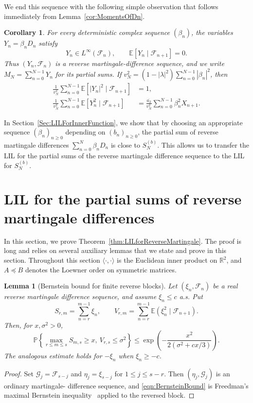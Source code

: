 \documentclass[12pt, reqno, final, a4paper]{amsart}
\theoremstyle{plain}
\newtheorem{lemma}[theorem]{Lemma}
\newtheorem{corollary}[theorem]{Corollary}
\theoremstyle{definition}
\theoremstyle{remark}
\newcommand{\E}{\mathbb E}
\newcommand{\1}{\mathbf 1}
\begin{document}
We end this sequence with the following simple observation that follows immediately from Lemma~\ref{cor:MomentsOfDn}. 
\begin{corollary}\label{cor:reversemartingale}
For every deterministic complex sequence $(\beta_n)$, the variables
$Y_n=\beta_nD_n$ satisfy
\[
 Y_n\in L^\infty(\mathcal F_n),\qquad
 \E[Y_n\mid\mathcal F_{n+1}]=0.
\]
Thus $(Y_n,\mathcal F_n)$ is a reverse martingale-difference sequence, and we
write $M_N=\sum_{n=0}^{N-1}Y_n$ for its partial sums. If
$v_N^2=(1-|\lambda|^2)\sum_{n=0}^{N-1}|\beta_n|^2$, then
\begin{align}
 \frac1{v_N^2}\sum_{n=0}^{N-1}
 \E[|Y_n|^2\mid\mathcal F_{n+1}]&=1,
 \label{eqn:QuadraticVariation}\\
 \frac1{v_N^2}\sum_{n=0}^{N-1}
 \E[Y_n^2\mid\mathcal F_{n+1}]&=
 \frac{\overline{a_2}}{v_N^2}
 \sum_{n=0}^{N-1}\beta_n^2X_{n+1}.
 \label{eqn:QuadraticCov}
\end{align}
\end{corollary}

In Section~\ref{Sec:LILForInnerFunction}, we show that by choosing an appropriate sequence $(\beta_n)_{n\geq 0}$ depending on $(b_n)_{n\geq 0}$, the partial sum of reverse martingale differences $\sum_{n=0}^{N}\beta_nD_n$ is close to $S_N^{(b)}$. This allows us to transfer the LIL for the partial sums of the reverse martingale difference sequence to the LIL for $S_N^{(b)}$. 


\section{LIL for the partial sums of reverse martingale differences}
\label{sec:ReverseMartingaleLIL}
In this section, we prove Theorem~\ref{thm:LILforReverseMartingale}. The proof is long and relies on several auxiliary lemmas that we state and prove in this section. Throughout this section $\langle\cdot,\cdot\rangle$ is the Euclidean inner
product on $\mathbb R^2$, and $A\preceq B$ denotes the Loewner order on
symmetric matrices. 


\begin{lemma}[Bernstein bound for finite reverse blocks]
\label{lem:reverse-freedman}
Let $(\xi_n,\mathcal F_n)$ be a real reverse martingale
difference sequence, and assume $\xi_n\le c$ a.s. Put
\[
 S_{r,m}=\sum_{n=r}^{m-1}\xi_n,
 \qquad
 V_{r,m}=\sum_{n=r}^{m-1}\E(\xi_n^2\mid\mathcal F_{n+1}).
\]
Then, for $x,\sigma^2>0$,
\begin{equation}\label{eqn:BernsteinBound}
 \mathbb P\left\{
 \max_{r\le m\le s}S_{m,s}\ge x,\ V_{r,s}\le\sigma^2
 \right\}
 \le \exp\left(-\frac{x^2}{2(\sigma^2+cx/3)}\right).
\end{equation}
The analogous estimate holds for $-\xi_n$ when $\xi_n\ge-c$.
\end{lemma}
\begin{proof}
Set $\mathcal G_j=\mathcal F_{s-j}$ and $\eta_j=\xi_{s-j}$ for
$1\le j\le s-r$. Then $(\eta_j,\mathcal G_j)$ is an ordinary martingale-
difference sequence, and \eqref{eqn:BernsteinBound} is Freedman's maximal
Bernstein inequality~\cite[Theorem~1.6]{Freedman1975} applied to the reversed block.
\end{proof}
\end{document}
